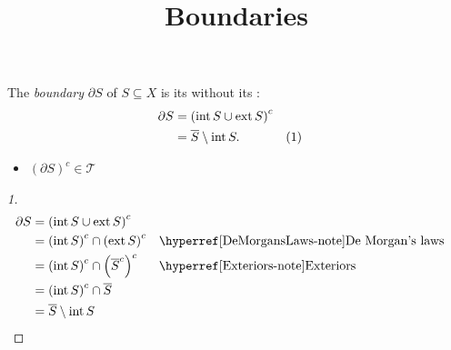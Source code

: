 \documentclass{atomic}
\title{Boundaries}
\begin{document}
    \pagestyle{plain}  \noindent
    The \textit{boundary} $\partial S$ of $S \subseteq X$ is its  without its :
    \begin{align*}
        \partial S &= \left( \operatorname{int} S \cup \operatorname{ext} S \right)^c \\
        &= \overline{S} \setminus \operatorname{int} S. && (1)
    \end{align*}

    \begin{itemize}
        \item $\left( \partial S \right)^c \in \mathcal{T}$
    \end{itemize}
    
    \begin{proof}[1]
        \phantom{}\vspace{-2em}
        \begin{align*}
            \partial S &= \left( \text{int}\,S \cup \text{ext}\, S \right)^c \\
                       &= \left( \text{int}\,S \right)^c \cap \left( \text{ext}\, S \right)^c && \text{\ex{DeMorgansLaws}{De Morgan's laws}} \\
                       &= \left( \text{int}\,S \right)^c \cap \left( \overline{S}^c \right)^c && \text{\ex{Exteriors}{Exteriors}} \\
            &= \left( \text{int}\,S \right)^c \cap \overline{S} \\
            &= \overline{S} \setminus \text{int}\,S
        \end{align*}
    \end{proof}
\end{document}
